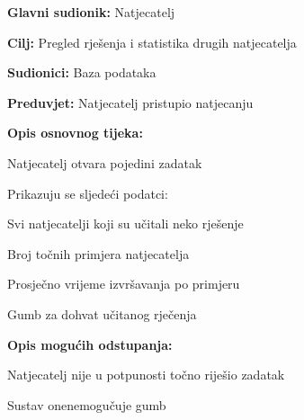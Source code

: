 					\noindent {}
					\begin{packed_item}
						
						\item \textbf{Glavni sudionik: }Natjecatelj
						\item  \textbf{Cilj:} Pregled rješenja i statistika drugih natjecatelja 
						\item  \textbf{Sudionici:} Baza podataka
						\item  \textbf{Preduvjet:} Natjecatelj pristupio natjecanju
						\item  \textbf{Opis osnovnog tijeka:}
						
						\item[] \begin{packed_enum}
							
							\item Natjecatelj otvara pojedini zadatak 
							\item Prikazuju se sljedeći podatci:
							 \item[] \begin{packed_enum}
							 	
							 	\item Svi natjecatelji koji su učitali neko rješenje
							 	\item Broj točnih primjera natjecatelja
							 	\item Prosječno vrijeme izvršavanja po primjeru 
							 	\item Gumb za dohvat učitanog rječenja
							 	
							 \end{packed_enum}
						\end{packed_enum}
						
						\item  \textbf{Opis mogućih odstupanja:}
						
						\item[] \begin{packed_item}
							
							\item[2.d] Natjecatelj nije u potpunosti točno riješio zadatak 
							\item[] \begin{packed_enum}
								
								\item Sustav onenemogučuje gumb
								
							\end{packed_enum}	
						\end{packed_item}
					\end{packed_item}


